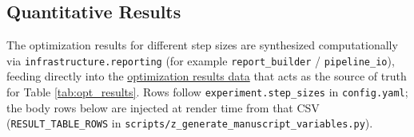 \documentclass[
]{article}
\begin{document}
\subsection{Quantitative Results}\label{quantitative-results}

The optimization results for different step sizes are synthesized
computationally via \texttt{infrastructure.reporting} (for example
\texttt{report\_builder} / \texttt{pipeline\_io}), feeding directly into
the
\href{https://github.com/docxology/template/blob/main/projects/code_project/output/data/optimization_results.csv}{optimization
results data} that acts as the source of truth for Table
\ref{tab:opt_results}. Rows follow \texttt{experiment.step\_sizes} in
\texttt{config.yaml}; the body rows below are injected at render time
from that CSV (\texttt{RESULT\_TABLE\_ROWS} in
\texttt{scripts/z\_generate\_manuscript\_variables.py}).
\end{document}
